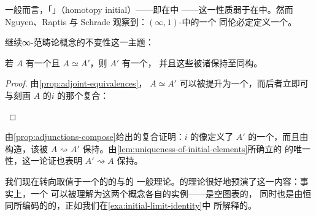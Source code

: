 一般而言，「\trHomotopyInitial」（homotopy initial）——即在\trHomotopyCategory{}中%
\trInitial{}——这一性质弱于在\trInfinityCategory{}中\trInitial{}。然而
Nguyen、Raptis 与 Schrade 观察到：\trComplete $(\infty,1)$-\trCategory{}中的一个
同伦\trInitial{}\trElement{}必定定义一个\trInitial{}\trElement \cite[2.2.2]{bib88}。

继续∞-范畴论概念的\trEquivalence{}不变性这一主题：

\begin{lemma}\label{lem:equivalence-invariance-initial-elements}
若 $A$ 有一个\trInitial{}\trElement{}且 $A\simeq A'$，则 $A'$ 有一个\trInitial{}\trElement{}，
并且这些\trElement{}被诸\trEquivalence{}保持至同构。
\end{lemma}
\begin{proof}
由\cref{prop:adjoint-equivalences}，\trEquivalence{} $A\simeq A'$
可以被提升为一个\trAdjointEquivalence{}，而后者立即可与刻画 $A$ 的\trInitial{}\trElement $i$
的那个\trAdjunction{}复合：
\begin{center}
\end{center}
\end{proof}

由\cref{prop:adjunctions-compose}给出的复合\trAdjunction{}证明：$i$ 的像定义了
$A'$ 的一个\trInitial{}\trElement{}，而且由构造，该\trElement{}被\trEquivalence{}
$A\rightsquigarrow A'$ 保持。由\cref{lem:uniqueness-of-initial-elements}所确立的%
\trInitial{}\trElement{}的唯一性，这一论证也表明\trEquivalence{} $A'\rightsquigarrow A$
保持\trInitial{}\trElement{}。

我们现在转向取值于一个\trInfinityCategory{}的\trDiagram{}的\trLimit{}与\trColimit{}的
一般理论。\trInitial{}\trElement{}的理论很好地预演了这一内容：事实上，一个\trInitial{}\trElement
可以被理解为这两个概念各自的实例——\trInitial{}\trElement{}是空图表的\trColimit{}，
同时也是由恒同\trFunctor{}所编码的\trDiagram{}的\trLimit{}，正如我们在\cref{exa:initial-limit-identity}中
所解释的。

